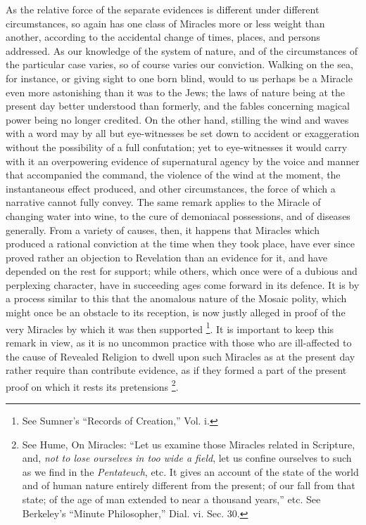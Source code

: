 As the relative force of the separate evidences
is different under different circumstances, so again has one class of
Miracles more or less weight than another, according to the accidental
change of times, places, and persons addressed. As our knowledge of
the system of nature, and of the circumstances of the particular case
varies, so of course varies our conviction. Walking on the sea, for
instance, or giving sight to one born blind, would to us perhaps be a
Miracle even more astonishing than it was to the Jews; the laws of
nature being at the present day better understood than formerly, and
the fables concerning magical power being no longer credited. On the
other hand, stilling the wind and waves with a word may by all but
eye-witnesses be set down to accident or exaggeration without the
possibility of a full confutation; yet to eye-witnesses it would carry
with it an overpowering evidence of supernatural agency by the voice
and manner that accompanied the command, the violence of the wind at
the moment, the instantaneous effect produced, and other
circumstances, the force of which a narrative cannot fully convey. The
same remark applies to the Miracle of changing water into wine, to the
cure of demoniacal possessions, and of diseases generally. From a
variety of causes, then, it happens that Miracles which produced a
rational conviction at the time when they took place, have ever since
proved rather an objection to Revelation than an evidence for it, and
have depended on the rest for support; while others, which once were
of a dubious and perplexing character, have in succeeding ages come
forward in its defence. It is by a process similar to this that the
anomalous nature of the Mosaic polity, which might once be an obstacle
to its reception, is now justly alleged in proof of the very Miracles
by which it was then supported \footnote{See Sumner's ``Records of Creation,'' Vol. i.}.
It is important to keep this remark in view, as it is no uncommon
practice with those who are ill-affected to the cause of Revealed
Religion to dwell upon such Miracles as at the present day rather
require than contribute evidence, as if they formed a part of the
present proof on which it rests its pretensions \footnote{See Hume, On Miracles: ``Let us examine those Miracles related in
Scripture, and, \emph{not to lose ourselves in too wide a field}, let
us confine ourselves to such as we find in the \emph{Pentateuch}, etc.
It gives an account of the state of the world and of human nature
entirely different from the present; of our fall from that state; of
the age of man extended to near a thousand years,'' etc. See Berkeley's
``Minute Philosopher,'' Dial. vi. Sec. 30.}.


